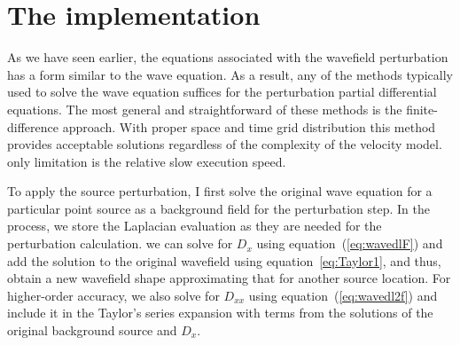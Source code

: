 \begin{comment}
In other word,
we need to obtain the phase shifts (traveltimes) for a single source once and that covers information for sources in the vicinity in a plane wave sense,
which is equivalent to a dynamic expansion of the wavefield without the need to trace rays. This feature can not be 
realized otherwise because conventionally as we use a new source we must modify the Green's function to adapt to the velocity structure.

\geouline{The key feature here is that the Green's function required to compute any of the Taylor's series expansion
coefficients is the same, and thus,} its traveltime and amplitude components are evaluated once for a single source
and is applicable for sources in the vicinity. In the conventional case, the Green's function is evaluated once for each source and its applicability
to other sources at the surface happens only when no lateral velocity variation is present.
\end{comment}


\section{The implementation}

As we have seen earlier, the equations associated with the wavefield perturbation has a form
similar to the wave equation. As a result, any of the methods typically used to solve the wave equation
suffices for the perturbation partial differential equations. The most general and straightforward of these methods is the finite-difference approach.
With proper space and time grid distribution this method provides acceptable solutions regardless of the complexity of the velocity model.   only
limitation is the relative slow execution speed.

To apply the source perturbation, I first solve the original wave equation for a particular point source as a background field for the perturbation step. 
In the process, we store the Laplacian evaluation as they are needed for the perturbation calculation. 
 we can solve for $D_x$ using
equation~(\ref{eq:wavedlF}) and add the solution to the original
wavefield using equation~\ref{eq:Taylor1}, and thus, obtain a new wavefield shape approximating that for another
source location. For higher-order accuracy, we also solve for $D_{xx}$ using
equation~(\ref{eq:wavedl2f})  and include it in the Taylor's series expansion
with terms from the solutions of the original background source and $D_x$.

